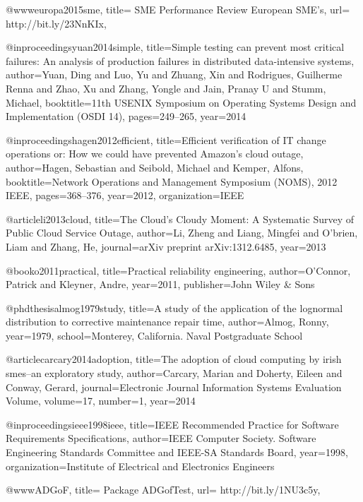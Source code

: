 @www{europa2015sme,
 title= {SME Performance Review {E}uropean {SME}'s},
  url= {http://bit.ly/23NnKIx},
}

@inproceedings{yuan2014simple,
  title={Simple testing can prevent most critical failures: An analysis of production failures in distributed data-intensive systems},
  author={Yuan, Ding and Luo, Yu and Zhuang, Xin and Rodrigues, Guilherme Renna and Zhao, Xu and Zhang, Yongle and Jain, Pranay U and Stumm, Michael},
  booktitle={11th USENIX Symposium on Operating Systems Design and Implementation (OSDI 14)},
  pages={249--265},
  year={2014}
}

@inproceedings{hagen2012efficient,
  title={Efficient verification of IT change operations or: How we could have prevented Amazon's cloud outage},
  author={Hagen, Sebastian and Seibold, Michael and Kemper, Alfons},
  booktitle={Network Operations and Management Symposium (NOMS), 2012 IEEE},
  pages={368--376},
  year={2012},
  organization={IEEE}
}

@article{li2013cloud,
  title={The Cloud's Cloudy Moment: A Systematic Survey of Public Cloud Service Outage},
  author={Li, Zheng and Liang, Mingfei and O'brien, Liam and Zhang, He},
  journal={arXiv preprint arXiv:1312.6485},
  year={2013}
}

@book{o2011practical,
  title={Practical reliability engineering},
  author={O'Connor, Patrick and Kleyner, Andre},
  year={2011},
  publisher={John Wiley \& Sons}
}

@phdthesis{almog1979study,
  title={A study of the application of the lognormal distribution to corrective maintenance repair time},
  author={Almog, Ronny},
  year={1979},
  school={Monterey, California. Naval Postgraduate School}
}

@article{carcary2014adoption,
  title={The adoption of cloud computing by irish smes--an exploratory study},
  author={Carcary, Marian and Doherty, Eileen and Conway, Gerard},
  journal={Electronic Journal Information Systems Evaluation Volume},
  volume={17},
  number={1},
  year={2014}
}

@inproceedings{ieee1998ieee,
  title={{IEEE} Recommended Practice for Software Requirements Specifications},
  author={IEEE Computer Society. Software Engineering Standards Committee and IEEE-SA Standards Board},
  year={1998},
  organization={Institute of Electrical and Electronics Engineers}
}

@www{ADGoF,
 title= {Package ADGofTest},
  url= {http://bit.ly/1NU3c5y},
}